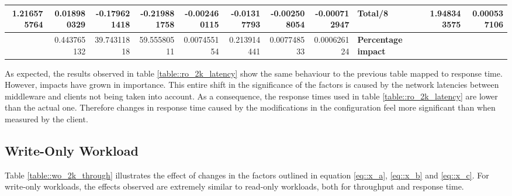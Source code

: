 \documentclass[11pt,a4paper]{article}
\begin{document}
{\begin{landscape}
{\begin{tabular}{|*{15}{r|}}
                \hline 1.216575764 & 0.018980329 & -0.179621418 & -0.219881758 & -0.002460115 & -0.01317793 & -0.002508054 & -0.000712947 & \multicolumn{3}{|l|}{\textbf{Total/8}} & \multicolumn{2}{|r|}{} & 1.948343575 & 0.000537106 \\
                \hline & 0.443765132 & 39.74311818 & 59.55580511 & 0.007455154 & 0.213914441 & 0.007748533 & 0.000626124 & \multicolumn{3}{|l|}{\textbf{Percentage impact}} & \multicolumn{4}{|l|}{} \\
                \hline
            \end{tabular}
        }
        \label{table::ro_2k_latency}

    \end{landscape}
    \clearpage%
}

As expected, the results observed in table \ref{table::ro_2k_latency} show the same behaviour to the previous table mapped to response time. However, impacts have grown in importance. This entire shift in the significance of the factors is caused by the network latencies between middleware and clients not being taken into account. As a consequence, the response times used in table \ref{table::ro_2k_latency} are lower than the actual one. Therefore changes in response time caused by the modifications in the configuration feel more significant than when measured by the client.


\subsection{Write-Only Workload}
Table \ref{table::wo_2k_through} illustrates the effect of changes in the factors outlined in equation \ref{eq::x_a}, \ref{eq::x_b} and \ref{eq::x_c}. For write-only workloads, the effects observed are extremely similar to read-only workloads, both for throughput and response time.
\end{document}
